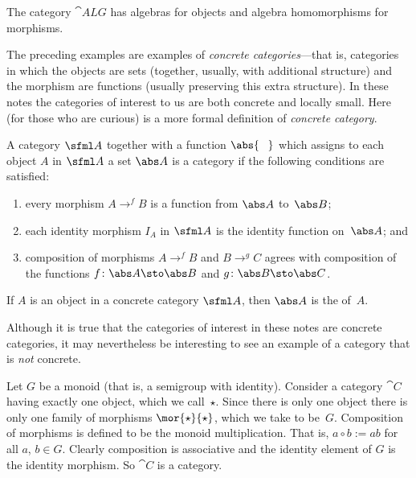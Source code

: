 \begin{exam} The category
$\cat{ALG}$ has algebras for objects and algebra homomorphisms for morphisms.
\end{exam}

The preceding examples are examples of \emph{concrete categories}---that is, categories
in which the objects are sets (together, usually, with additional structure) and the
morphism are functions (usually preserving this extra structure).  In these notes the
categories of interest to us are both concrete and locally small.  Here (for those who are curious) is a
more formal definition of \emph{concrete category}.

\begin{defn}\label{C015124} A category $\sfml A$ together with a function $\abs{\hphantom{O}}$ which assigns
to each object $A$ in $\sfml A$ a set $\abs A$ is a
 category if the following conditions are satisfied:
 \begin{enumerate}
    \item every morphism $A \to^f B$ is a function from $\abs A$ to~$\abs B$;
    \item each identity morphism $I_A$ in $\sfml A$ is the identity function on~$\abs A$; and
    \item composition of morphisms $A \to^f B$ and $B \to^g C$ agrees with composition
of the functions $f\colon \abs A \sto \abs B$ and $g\colon \abs B \sto \abs C$.
 \end{enumerate}
If $A$ is an object in a concrete category $\sfml A$, then $\abs A$ is the
 of~$A$.
\end{defn}

Although it is true that the categories of interest in these notes are concrete
categories, it may nevertheless be interesting to see an example of a category that is
\emph{not} concrete.

\begin{exam}\label{C015127} Let $G$ be a monoid (that is, a semigroup with identity).
Consider a category $\cat C$ having exactly one object, which we call~$\star$. Since there
is only one object there is only one family of morphisms $\mor{\star}{\star}$, which we
take to be~$G$. Composition of morphisms is defined to be the monoid multiplication.
That is, $a \circ b := ab$ for all $a$, $b \in G$. Clearly composition is associative and
the identity element of $G$ is the identity morphism. So $\cat C$ is a category.
\end{exam}

